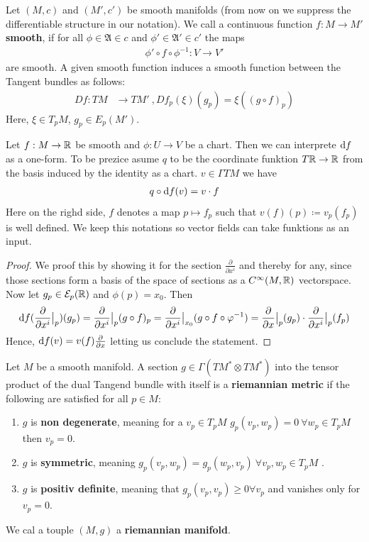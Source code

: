 \begin{definition}
    Let $(M,c)$ and $(M',c')$ be smooth manifolds (from now on we suppress the differentiable structure in our notation). We call a continuous function $f:M \to M'$ \textbf{smooth}, if for all $\phi\in \mathfrak{A}\in c$ and $\phi'\in \mathfrak{A}'\in c'$ the maps
    \begin{align*}
        \phi'\circ f\circ  \phi^{-1}:V\to V'
    \end{align*} are smooth. A given smooth function induces a smooth function between the Tangent bundles as follows:
    \begin{align*}
        Df: TM &\to TM' ~,Df_p(\xi)(g_p)=\xi((g\circ f)_p)
    \end{align*}Here, $\xi\in T_pM$, $g_p\in E_p(M')$.
\end{definition}
\begin{corollary}
	Let $f:M\to \mathbb{R}$ be smooth and $\phi: U\to V$ be a chart. Then we can interprete $\mathop{}\!\mathrm{d} f$ as a one-form. To be prezice asume $q$ to be the coordinate funktion $T\mathbb{R}\to \mathbb{R}$ from the basis induced by the identity as a chart. $v\in \Gamma TM$ we have
	\begin{align*}
		 q\circ \mathop{}\!\mathrm{d} f(v)=v\cdot f
	\end{align*} Here on the righd side, $f$ denotes a map $p\mapsto f_p$ such that $v(f)(p)\coloneq v_p(f_p)$ is well defined. We keep this notations so vector fields can take funktions as an input.
\end{corollary}
\begin{proof}
	We proof this by showing it for the section $\frac{\partial}{\partial x^i}$ and thereby for any, since those sections form a basis of the space of sections as a $C^{\infty}(M,\mathbb{R})$ vectorspace. Now let $g_p\in \mathcal{E}_p(\mathbb{R})$ and $\phi(p)=x_0$. Then
	\begin{align*}
		\mathop{}\!\mathrm{d} f(\frac{\partial }{\partial x^i}\big|_p)(g_p)= \frac{\partial }{\partial x^i}\big|_p (g\circ f)_p=\frac{\partial }{\partial x^i}\big|_{x_0}(g\circ f\circ \varphi^{-1})=\frac{\partial }{\partial x}\big|_{p}(g_p) \cdot \frac{\partial }{\partial x^i}\big|_p(f_p)
	\end{align*}
	Hence, $\mathop{}\!\mathrm{d} f (v)=v(f)\frac{\partial }{\partial x}$ letting us conclude the statement.
\end{proof}
\begin{definition}[A Metric]
	Let $M$ be a smooth manifold.
	A section $g\in \Gamma(TM^*\otimes TM^*)$ into the tensor product of the dual Tangend bundle with itself is a\textbf{ riemannian metric} if the following are satisfied for all $p\in M$:
	\begin{enumerate}
		\item $g$ is \textbf{non degenerate}, meaning for a $v_p\in T_pM$ $g_p(v_p,w_p)=0 ~\forall w_p\in T_pM$ then $v_p=0$.
		\item $g$ is \textbf{symmetric}, meaning $g_p(v_p,w_p)=g_p(w_p,v_p)~\forall v_p,w_p\in T_pM$ .
		\item $g$ is \textbf{positiv definite}, meaning that $g_p(v_p,v_p)\geq 0 \forall v_p$ and vanishes only for $v_p=0$.
	\end{enumerate} We cal a touple $(M,g)$ a \textbf{riemannian manifold}.
\end{definition}
